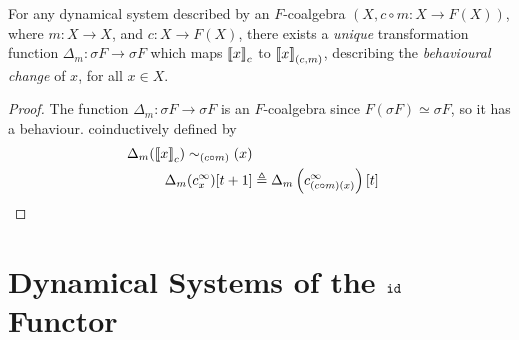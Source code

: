 \begin{definition}
\begin{proposition}
For any dynamical system described by an $F$-coalgebra 
$(X,c\circ m\colon X\rightarrow F(X))$, where $m\colon X\rightarrow X$, and  $c\colon X\rightarrow F(X)$, there exists a \emph{unique} transformation function $\Delta_m\colon \sigma F\rightarrow \sigma F$ which maps ${{\llbracket x\rrbracket}}_{c}$ to ${{\llbracket x\rrbracket}}_{({c},{m})}$, describing the \emph{behavioural change} of $x$, for all $x\in X$.
\end{proposition}
\begin{proof}
    The function $\Delta_{m}\colon \sigma F\rightarrow \sigma F$ is an $F$-coalgebra since $F(\sigma F)\simeq \sigma F$, so it has a behaviour. 
coinductively defined by 
{\color{red}
\begin{align*}
    \Delta_{m}({{\llbracket x\rrbracket}}_{c}) \sim_{(c \circ m)} (x)\\
    \Delta_{m}(c^\infty_x)[t+1]&\triangleq \Delta_{m}\left(c^\infty_{(c\circ m)(x)}\right)[t]
\end{align*}
}
\end{proof}

\section{Dynamical Systems of the ${\texttt{id}}$ Functor}




\end{definition}
